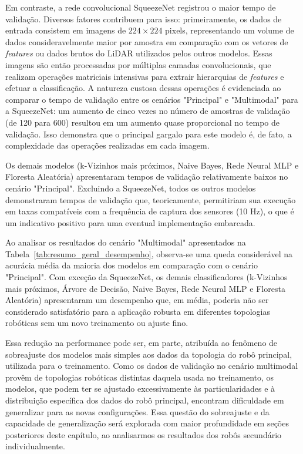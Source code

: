 Em contraste, a rede convolucional SqueezeNet registrou o maior tempo de validação. Diversos fatores contribuem para isso: primeiramente, os dados de entrada consistem em imagens de $224 \times 224$ pixels, representando um volume de dados consideravelmente maior por amostra em comparação com os vetores de \textit{features} ou dados brutos do LiDAR utilizados pelos outros modelos. Essas imagens são então processadas por múltiplas camadas convolucionais, que realizam operações matriciais intensivas para extrair hierarquias de \textit{features} e efetuar a classificação. A natureza custosa dessas operações é evidenciada ao comparar o tempo de validação entre os cenários "Principal" e "Multimodal" para a SqueezeNet: um aumento de cinco vezes no número de amostras de validação (de 120 para 600) resultou em um aumento quase proporcional no tempo de validação. Isso demonstra que o principal gargalo para este modelo é, de fato, a complexidade das operações realizadas em cada imagem.

Os demais modelos (k-Vizinhos mais próximos, Naive Bayes, Rede Neural MLP e Floresta Aleatória) apresentaram tempos de validação relativamente baixos no cenário "Principal". Excluindo a SqueezeNet, todos os outros modelos demonstraram tempos de validação que, teoricamente, permitiriam sua execução em taxas compatíveis com a frequência de captura dos sensores (10 Hz), o que é um indicativo positivo para uma eventual implementação embarcada.

Ao analisar os resultados do cenário "Multimodal" apresentados na Tabela~\ref{tab:resumo_geral_desempenho}, observa-se uma queda considerável na acurácia média da maioria dos modelos em comparação com o cenário "Principal". Com exceção da SqueezeNet, os demais classificadores (k-Vizinhos mais próximos, Árvore de Decisão, Naive Bayes, Rede Neural MLP e Floresta Aleatória) apresentaram um desempenho que, em média, poderia não ser considerado satisfatório para a aplicação robusta em diferentes topologias robóticas sem um novo treinamento ou ajuste fino.

Essa redução na performance pode ser, em parte, atribuída ao fenômeno de sobreajuste dos modelos mais simples aos dados da topologia do robô principal, utilizada para o treinamento. Como os dados de validação no cenário multimodal provêm de topologias robóticas distintas daquela usada no treinamento, os modelos, que podem ter se ajustado excessivamente às particularidades e à distribuição específica dos dados do robô principal, encontram dificuldade em generalizar para as novas configurações. Essa questão do sobreajuste e da capacidade de generalização será explorada com maior profundidade em seções posteriores deste capítulo, ao analisarmos os resultados dos robôs secundário individualmente.

